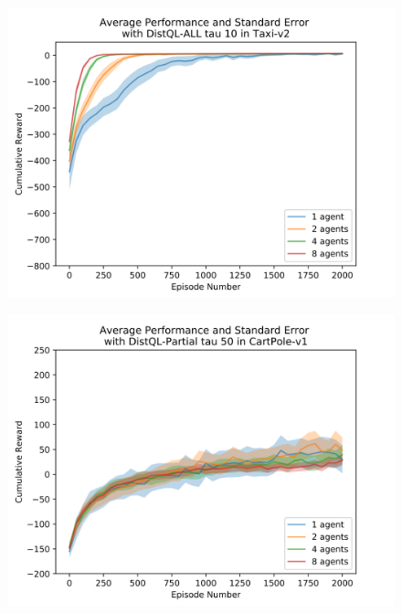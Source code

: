 \documentclass[jair,twoside,11pt,theapa]{article}
\begin{document}
\begin{figure}[h]
	\centering
	\includegraphics[width=1\linewidth]{resultImages/binned-Average-Performance-and-Standard-Error-with-DistQL-ALL-tau-10-in-Taxi-v2}
	\caption{}
	\label{fig:binned-Average-Performance-and-Standard-Error-with-DistQL-ALL-tau-10-in-Taxi-v2}
\end{figure}

\begin{figure}[h]
	\centering
	\includegraphics[width=0.7\linewidth]{resultImages/binned-Average-Performance-and-Standard-Error-with-DistQL-Partial-tau-50-in-CartPole-v1}
	\caption{}
	\label{fig:binned-Average-Performance-and-Standard-Error-with-DistQL-Partial-tau-50-in-CartPole-v1}
\end{figure}
\end{document}
